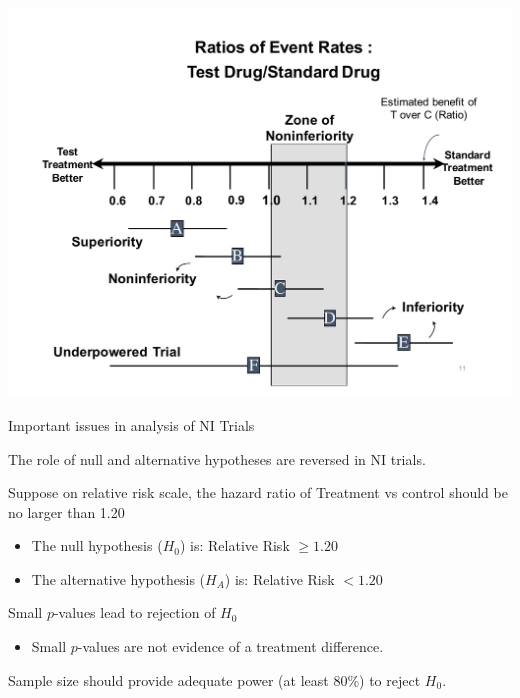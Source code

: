 \documentclass[ignorenonframetext,]{beamer}
\providecommand{\tightlist}{%
\setlength{\itemsep}{0pt}\setlength{\parskip}{0pt}}
\begin{document}
\begin{frame}{}

\includegraphics{ni_ci_rr_full.pdf}

\end{frame}

\begin{frame}{Important issues in analysis of NI Trials}

The role of null and alternative hypotheses are reversed in NI trials.

Suppose on relative risk scale, the hazard ratio of Treatment vs control
should be no larger than 1.20

\begin{itemize}
\item
  The null hypothesis (\(H_0\)) is: Relative Risk \(\ge 1.20\)
\item
  The alternative hypothesis (\(H_A\)) is: Relative Risk \(< 1.20\)
\end{itemize}

Small \(p\)-values lead to rejection of \(H_0\)

\begin{itemize}
\tightlist
\item
  Small \(p\)-values are not evidence of a treatment difference.
\end{itemize}

Sample size should provide adequate power (at least 80\%) to reject
\(H_0\).

\end{frame}
\end{document}
